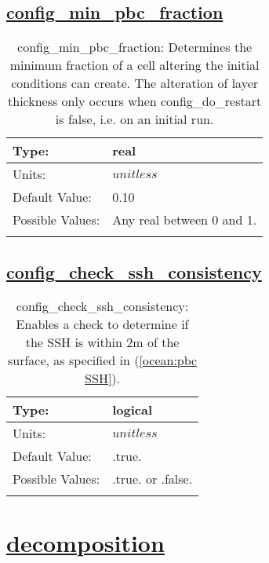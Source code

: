 \subsection[config\_min\_pbc\_fraction]{\hyperref[sec:nm_tab_partial_bottom_cells]{config\_min\_pbc\_fraction}}
\label{subsec:nm_sec_config_min_pbc_fraction}
\begin{center}
\begin{longtable}{| p{2.0in} | p{4.0in} |}
    \hline
    Type: & real \\
    \hline
    Units: & $unitless$ \\
    \hline
    Default Value: & 0.10 \\
    \hline
    Possible Values: & Any real between 0 and 1. \\
    \hline
    \caption{config\_min\_pbc\_fraction: Determines the minimum fraction of a cell altering the initial conditions can create.  The alteration of layer thickness only occurs when config\_do\_restart is false, i.e. on an initial run.}
\end{longtable}
\end{center}
\subsection[config\_check\_ssh\_consistency]{\hyperref[sec:nm_tab_partial_bottom_cells]{config\_check\_ssh\_consistency}}
\label{subsec:nm_sec_config_check_ssh_consistency}
\begin{center}
\begin{longtable}{| p{2.0in} | p{4.0in} |}
    \hline
    Type: & logical \\
    \hline
    Units: & $unitless$ \\
    \hline
    Default Value: & .true. \\
    \hline
    Possible Values: & .true. or .false. \\
    \hline
    \caption{config\_check\_ssh\_consistency: Enables a check to determine if the SSH is within 2m of the surface, as specified in (\ref{ocean:pbc SSH}).}
\end{longtable}
\end{center}
\section[decomposition]{\hyperref[sec:nm_tab_decomposition]{decomposition}}
\label{sec:nm_sec_decomposition}
